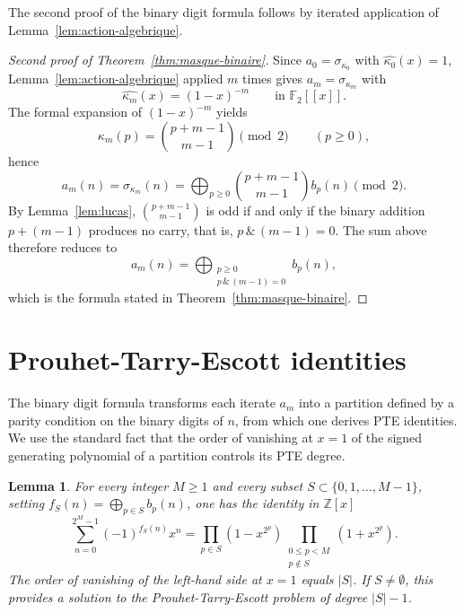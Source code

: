 \documentclass[12pt,reqno]{article}
\newcommand{\Z}{\mathbb{Z}}
\theoremstyle{plain}
\newtheorem{lemma}[theorem]{Lemma}
\theoremstyle{definition}
\begin{document}
The second proof of the binary digit formula follows by iterated application of Lemma~\ref{lem:action-algebrique}.

\begin{proof}[Second proof of Theorem~\ref{thm:masque-binaire}]
Since $a_0 = \sigma_{\kappa_0}$ with $\widehat{\kappa_0}(x) = 1$, Lemma~\ref{lem:action-algebrique} applied $m$ times gives $a_m = \sigma_{\kappa_m}$ with
\[
  \widehat{\kappa_m}(x) = (1-x)^{-m} \qquad \text{in } \mathbb{F}_2[[x]].
\]
The formal expansion of $(1-x)^{-m}$ yields
\[
  \kappa_m(p) = \binom{p+m-1}{m-1} \pmod 2 \qquad (p \ge 0),
\]
hence
\[
  a_m(n) = \sigma_{\kappa_m}(n) = \bigoplus_{p \ge 0} \binom{p+m-1}{m-1} b_p(n) \pmod 2.
\]
By Lemma~\ref{lem:lucas}, $\binom{p+m-1}{m-1}$ is odd if and only if the binary addition $p + (m-1)$ produces no carry, that is, $p \,\&\, (m-1) = 0$. The sum above therefore reduces to
\[
  a_m(n) = \bigoplus_{\substack{p \ge 0 \\ p\,\&\,(m-1) = 0}} b_p(n),
\]
which is the formula stated in Theorem~\ref{thm:masque-binaire}.
\end{proof}

\section{Prouhet-Tarry-Escott identities}
\label{sec:PTE}

The binary digit formula transforms each iterate $a_m$ into a partition defined by a parity condition on the binary digits of $n$, from which one derives PTE identities. We use the standard fact that the order of vanishing at $x=1$ of the signed generating polynomial of a partition controls its PTE degree.

\begin{lemma}
\label{lem:factorisation-PTE}
For every integer $M \ge 1$ and every subset $S \subset \{0, 1, \dots, M-1\}$, setting $f_S(n) = \bigoplus_{p \in S} b_p(n)$, one has the identity in $\Z[x]$
\[
  \sum_{n=0}^{2^M-1} (-1)^{f_S(n)} x^n = \prod_{p \in S} (1 - x^{2^p}) \prod_{\substack{0 \le p < M \\ p \notin S}} (1 + x^{2^p}).
\]
The order of vanishing of the left-hand side at $x = 1$ equals $|S|$. If $S \neq \emptyset$, this provides a solution to the Prouhet-Tarry-Escott problem of degree $|S| - 1$.
\end{lemma}
\end{document}
